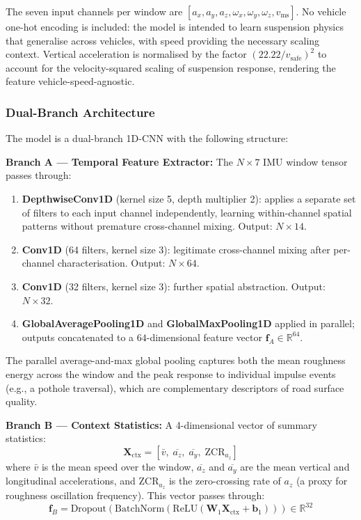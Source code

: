 \documentclass[conference]{IEEEtran}
\begin{document}
The seven input channels per window are $[a_x, a_y, a_z, \omega_x, \omega_y, \omega_z, v_{\text{ms}}]$.
No vehicle one-hot encoding is included: the model is intended to learn suspension physics that generalise across vehicles, with speed providing the necessary scaling context.
Vertical acceleration is normalised by the factor $(22.22 / v_{\text{safe}})^2$ to account for the velocity-squared scaling of suspension response, rendering the feature vehicle-speed-agnostic.

\subsubsection{Dual-Branch Architecture}

The model is a dual-branch 1D-CNN with the following structure:

\textbf{Branch A --- Temporal Feature Extractor:} The $N \times 7$ IMU window tensor passes through:
\begin{enumerate}
    \item \textbf{DepthwiseConv1D} (kernel size 5, depth multiplier 2): applies a separate set of filters to each input channel independently, learning within-channel spatial patterns without premature cross-channel mixing.
Output: $N \times 14$.
    \item \textbf{Conv1D} (64 filters, kernel size 3): legitimate cross-channel mixing after per-channel characterisation.
Output: $N \times 64$.
    \item \textbf{Conv1D} (32 filters, kernel size 3): further spatial abstraction. Output: $N \times 32$.
    \item \textbf{GlobalAveragePooling1D} and \textbf{GlobalMaxPooling1D} applied in parallel; outputs concatenated to a $64$-dimensional feature vector $\mathbf{f}_A \in \mathbb{R}^{64}$.
\end{enumerate}

The parallel average-and-max global pooling captures both the mean roughness energy across the window and the peak response to individual impulse events (e.g., a pothole traversal), which are complementary descriptors of road surface quality.

\textbf{Branch B --- Context Statistics:} A 4-dimensional vector of summary statistics:
\begin{equation}
\label{eq:ctx}
\mathbf{X}_{\text{ctx}} = \left[\bar{v},\; \overline{a_z},\; \overline{a_y},\; \text{ZCR}_{a_z}\right]
\end{equation}
where $\bar{v}$ is the mean speed over the window, $\overline{a_z}$ and $\overline{a_y}$ are the mean vertical and longitudinal accelerations, and $\text{ZCR}_{a_z}$ is the zero-crossing rate of $a_z$ (a proxy for roughness oscillation frequency).
This vector passes through:
\begin{equation}
\label{eq:ctx_branch}
\mathbf{f}_B = \text{Dropout}\!\left(\text{BatchNorm}\!\left(\text{ReLU}(\mathbf{W}_1 \mathbf{X}_{\text{ctx}} + \mathbf{b}_1)\right)\right) \in \mathbb{R}^{32}
\end{equation}
\end{document}
